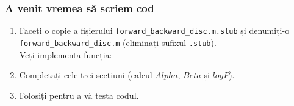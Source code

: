 \begin{frame}
  \frametitle{A venit vremea să scriem cod}
  \begin{enumerate}
  \item Faceți o copie a fișierului \texttt{forward\_backward\_disc.m.stub} 
    și denumiți-o \texttt{forward\_backward\_disc.m} (eliminați sufixul \texttt{.stub}).
    \\Veți implementa funcția:\\
    \pause
  \item Completați cele trei secțiuni (calcul $Alpha$, $Beta$ și $logP$).%
    \vspace*{-.5em}
    
\item Folosiți  pentru a vă testa codul.
\end{enumerate}
\end{frame}
